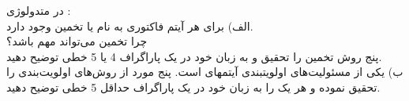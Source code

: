 در متدولوژی :
\\
الف) برای هر آیتم  فاکتوری به نام  یا تخمین وجود دارد. \\
چرا تخمین می‌تواند مهم باشد؟\\
پنج روش تخمین را تحقیق و به زبان خود در یک پاراگراف 4 یا 5 خطی توضیح دهید.\\
ب) یکی از مسئولیت‌های  اولویتبندی آیتمهای  است. پنج مورد از روش‌های اولویت‌بندی را تحقیق نموده و هر یک را به زبان خود در یک پاراگراف حداقل 5 خطی توضیح دهید.

\\ 